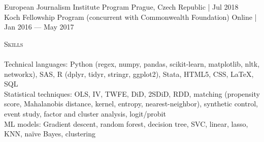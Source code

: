 \documentclass[a4paper,11pt]{article}
\newcommand{\lineunder} {
    \vspace*{-8pt} \\
    \hspace*{-18pt} \hrulefill \\
}
\newcommand{\header} [1] {
    {\hspace*{-18pt}\vspace*{6pt} \textsc{\large{#1}}}
    \vspace*{-6pt} \lineunder
}
\begin{document}
European Journalism Institute Program \hfill \faMapMarker\space Prague, Czech Republic | \faCalendar\space Jul 2018 \\

Koch Fellowship Program (concurrent with Commonwealth Foundation) \hfill \faMapMarker\space Online | \faCalendar\space Jan 2016 --- May 2017

\vspace{1mm}
\header{Skills}
Technical languages: Python (regex, numpy, pandas, scikit-learn, matplotlib, nltk, networkx), SAS, R (dplyr, tidyr, stringr, ggplot2), Stata, HTML5, CSS, \LaTeX, SQL \\

Statistical techniques: OLS, IV, TWFE, DiD, 2SDiD, RDD, matching (propensity score, Mahalanobis distance, kernel, entropy, nearest-neighbor), synthetic control, event study, factor and cluster analysis, logit/probit \\

ML models: Gradient descent, random forest, decision tree, SVC, linear, lasso, KNN, na\"{i}ve Bayes, clustering
\end{document}
